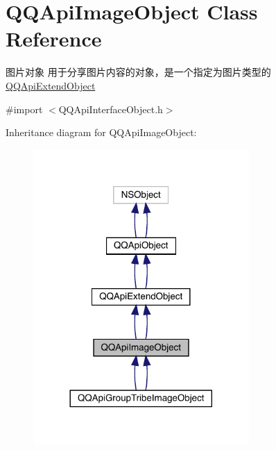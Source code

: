 \hypertarget{interface_q_q_api_image_object}{}\section{Q\+Q\+Api\+Image\+Object Class Reference}
\label{interface_q_q_api_image_object}


图片对象 用于分享图片内容的对象，是一个指定为图片类型的{\ttfamily \mbox{\hyperlink{interface_q_q_api_extend_object}{Q\+Q\+Api\+Extend\+Object}}}  




{\ttfamily \#import $<$Q\+Q\+Api\+Interface\+Object.\+h$>$}



Inheritance diagram for Q\+Q\+Api\+Image\+Object\+:\nopagebreak
\begin{figure}[H]
\begin{center}
\leavevmode
\includegraphics[width=233pt]{interface_q_q_api_image_object__inherit__graph}
\end{center}
\end{figure}


